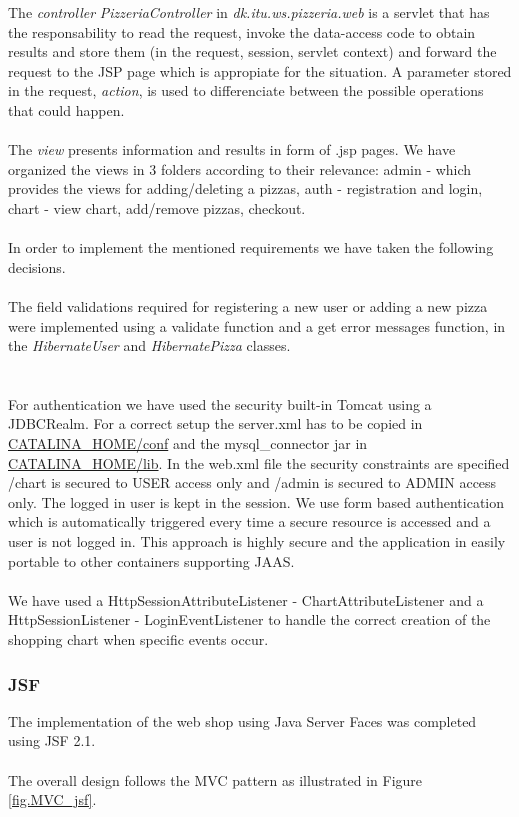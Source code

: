 The \emph{controller} \emph{PizzeriaController} in
\emph{dk.itu.ws.pizzeria.web} is a servlet that has the responsability to read
the request, invoke the data-access code to obtain results and store them (in
the request, session, servlet context) and forward the request to the JSP page
which is appropiate for the situation. A parameter stored in the request,
\emph{action}, is used to differenciate between the possible operations
that could happen.\\\\
The \emph{view} presents information and results in form of .jsp pages. We
have organized the views in 3 folders according to their relevance: admin -
which provides the views for adding/deleting a pizzas, auth - registration
and login, chart - view chart, add/remove pizzas, checkout.\\\\
In order to implement the mentioned requirements we have taken the following
decisions.\\\\
The field validations required for registering a
new user or adding a new pizza were implemented using a validate function and 
a get error messages function, in the \emph{HibernateUser} and \emph{HibernatePizza} classes.\\
\\\\
For authentication we have used the security built-in Tomcat using a
JDBCRealm. For a correct setup the server.xml has to be copied in
\url{CATALINA_HOME/conf} and the mysql\_connector jar in \url{CATALINA_HOME/lib}. In the web.xml file the
security constraints are specified /chart is secured to USER access only and /admin is secured to ADMIN access only.
The logged in user is kept in the session. We use form based
authentication which is automatically triggered every time a secure resource
is accessed and a user is not logged in. This approach is highly secure and the
application in easily portable to other containers supporting JAAS.
\\\\
We have used a HttpSessionAttributeListener - ChartAttributeListener and a
HttpSessionListener - LoginEventListener to handle the correct creation of the
shopping chart when specific events occur.
\subsubsection{JSF}
\label{sec.thesystem.jsf}
The implementation of the web shop using Java Server Faces was completed using
JSF 2.1.\\\\
The overall design follows the MVC pattern as illustrated in Figure
\ref{fig.MVC_jsf}. 

